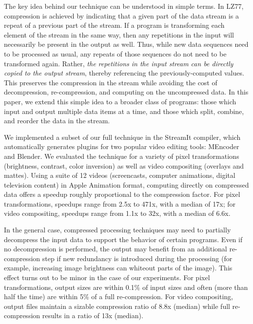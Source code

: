 The key idea behind our technique can be understood in simple terms.
In LZ77, compression is achieved by indicating that a given part of
the data stream is a repeat of a previous part of the stream.  If a
program is transforming each element of the stream in the same way,
then any repetitions in the input will necessarily be present in the
output as well.  Thus, while new data sequences need to be processed
as usual, any repeats of those sequences do not need to be transformed
again.  Rather, {\it the repetitions in the input stream can be
  directly copied to the output stream}, thereby referencing the
previously-computed values.  This preserves the compression in the
stream while avoiding the cost of decompression, re-compression, and
computing on the uncompressed data.  In this paper, we extend this
simple idea to a broader class of programs: those which input and
output multiple data items at a time, and those which split, combine,
and reorder the data in the stream.

We implemented a subset of our full technique in the StreamIt
compiler, which automatically generates plugins for two popular video
editing tools: MEncoder and Blender.  We evaluated the technique for a
variety of pixel transformations (brightness, contrast, color
inversion) as well as video compositing (overlays and mattes).  Using
a suite of 12 videos (screencasts, computer animations, digital
television content) in Apple Animation format, computing directly on
compressed data offers a speedup roughly proportional to the
compression factor.  For pixel transformations, speedups range from
2.5x to 471x, with a median of 17x; for video compositing, speedups
range from 1.1x to 32x, with a median of 6.6x.

In the general case, compressed processing techniques may need to
partially decompress the input data to support the behavior of certain
programs.  Even if no decompression is performed, the output may
benefit from an additional re-compression step if new redundancy is
introduced during the processing (for example, increasing image
brightness can whiteout parts of the image).  This effect turns out to
be minor in the case of our experiments.  For pixel transformations,
output sizes are within 0.1\% of input sizes and often (more than half
the time) are within 5\% of a full re-compression.  For video
compositing, output files maintain a sizable compression ratio of 8.8x
(median) while full re-compression results in a ratio of 13x (median).

